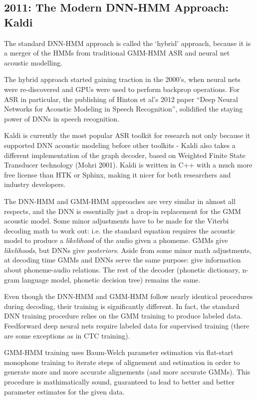 \documentclass[10pt,a4paper]{article}
\begin{document}
\subsection{2011: The Modern DNN-HMM Approach: Kaldi}

The standard DNN-HMM approach is called the `hybrid' approach, because it is a merger of the HMMs from traditional GMM-HMM ASR and neural net acoustic modelling.

The hybrid approach started gaining traction in the 2000's, when neural nets were re-discovered and GPUs were used to perform backprop operations. For ASR in particular, the publishing of Hinton et al's 2012 paper ``Deep Neural Networks for Acoustic Modeling in Speech Recognition'', solidified the staying power of DNNs in speech recognition.

Kaldi is currently the most popular ASR toolkit for research not only because it supported DNN acoustic modeling before other toolkits - Kaldi also takes a different implementation of the graph decoder, based on Weighted Finite State Transducer technology (Mohri 2001). Kaldi is written in C++ with a much more free license than HTK or Sphinx, making it nicer for both researchers and industry developers.

The DNN-HMM and GMM-HMM approaches are very similar in almost all respects, and the DNN is essentially just a drop-in replacement for the GMM acoustic model. Some minor adjustments have to be made for the Viterbi decoding math to work out: i.e. the standard equation requires the acoustic model to produce a \textit{likelihood} of the audio given a phomeme. GMMs give \textit{likelihoods}, but DNNs give \textit{posteriors}. Aside from some minor math adjustments, at decoding time GMMs and DNNs serve the same purpose: give information about phoneme-audio relations. The rest of the decoder (phonetic dictionary, n-gram language model, phonetic decision tree) remains the same.

Even though the DNN-HMM and GMM-HMM follow nearly identical procedures during decoding, their training is significantly different. In fact, the standard DNN training procedure relies on the GMM training to produce labeled data. Feedforward deep neural nets require labeled data for supervised training (there are some exceptions as in CTC training).

GMM-HMM training uses Baum-Welch parameter estimation via flat-start monophone training to iterate steps of alignement and estimation in order to generate more and more accurate alignements (and more accurate GMMs). This procedure is mathimatically sound, guaranteed to lead to better and better parameter estimates for the given data.
\end{document}
